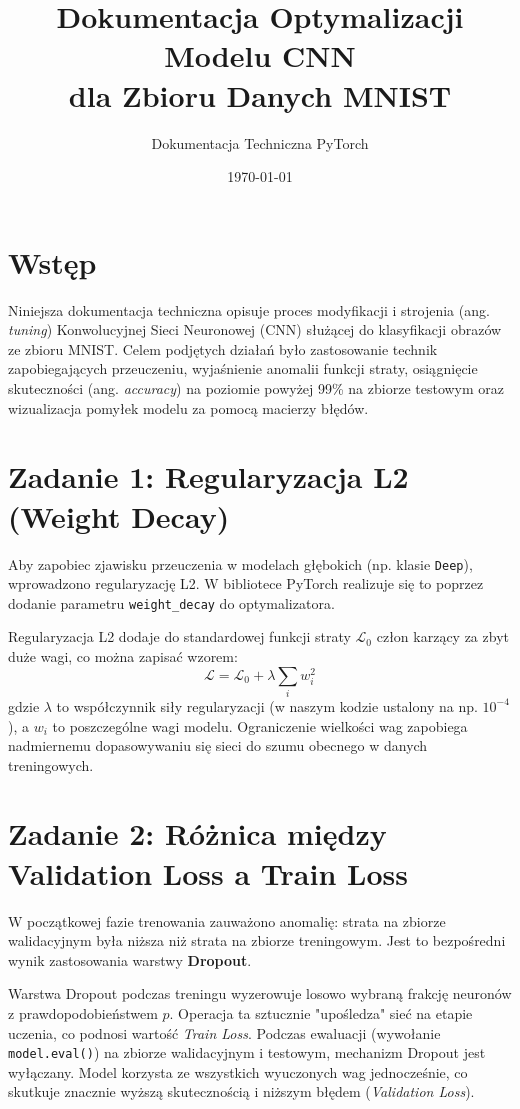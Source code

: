 \documentclass[12pt,a4paper]{article}
\title{Dokumentacja Optymalizacji Modelu CNN \\ dla Zbioru Danych MNIST}
\author{Dokumentacja Techniczna PyTorch}
\date{\today}
\begin{document}
\maketitle
\tableofcontents
\newpage

\section{Wstęp}
Niniejsza dokumentacja techniczna opisuje proces modyfikacji i strojenia (ang. \textit{tuning}) Konwolucyjnej Sieci Neuronowej (CNN) służącej do klasyfikacji obrazów ze zbioru MNIST. Celem podjętych działań było zastosowanie technik zapobiegających przeuczeniu, wyjaśnienie anomalii funkcji straty, osiągnięcie skuteczności (ang. \textit{accuracy}) na poziomie powyżej 99\% na zbiorze testowym oraz wizualizacja pomyłek modelu za pomocą macierzy błędów.

\section{Zadanie 1: Regularyzacja L2 (Weight Decay)}
Aby zapobiec zjawisku przeuczenia w modelach głębokich (np. klasie \texttt{Deep}), wprowadzono regularyzację L2. W bibliotece PyTorch realizuje się to poprzez dodanie parametru \texttt{weight\_decay} do optymalizatora.

Regularyzacja L2 dodaje do standardowej funkcji straty $\mathcal{L}_0$ człon karzący za zbyt duże wagi, co można zapisać wzorem:
$$ \mathcal{L} = \mathcal{L}_0 + \lambda \sum_{i} w_i^2 $$
gdzie $\lambda$ to współczynnik siły regularyzacji (w naszym kodzie ustalony na np. $10^{-4}$), a $w_i$ to poszczególne wagi modelu. Ograniczenie wielkości wag zapobiega nadmiernemu dopasowywaniu się sieci do szumu obecnego w danych treningowych.

\section{Zadanie 2: Różnica między Validation Loss a Train Loss}
W początkowej fazie trenowania zauważono anomalię: strata na zbiorze walidacyjnym była niższa niż strata na zbiorze treningowym. Jest to bezpośredni wynik zastosowania warstwy \textbf{Dropout}.

Warstwa Dropout podczas treningu wyzerowuje losowo wybraną frakcję neuronów z prawdopodobieństwem $p$. Operacja ta sztucznie "upośledza" sieć na etapie uczenia, co podnosi wartość \textit{Train Loss}. 
Podczas ewaluacji (wywołanie \texttt{model.eval()}) na zbiorze walidacyjnym i testowym, mechanizm Dropout jest wyłączany. Model korzysta ze wszystkich wyuczonych wag jednocześnie, co skutkuje znacznie wyższą skutecznością i niższym błędem (\textit{Validation Loss}).
\end{document}
